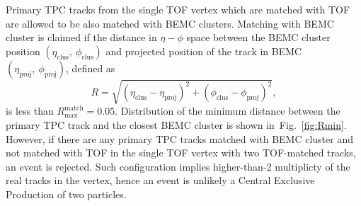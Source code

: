 Primary TPC tracks from the single TOF vertex which are matched with TOF are allowed to be also matched with BEMC clusters. Matching with BEMC cluster is claimed if the distance in $\eta-\phi$ space between the BEMC cluster position $(\eta_{\textrm{clus}},~\phi_{\textrm{clus}})$ and projected position of the track in BEMC $(\eta_{\textrm{proj}},~\phi_{\textrm{proj}})$, defined as
\begin{equation}
 R=\sqrt{(\eta_{\textrm{clus}}-\eta_{\textrm{proj}})^{2} + (\phi_{\textrm{clus}}-\phi_{\textrm{proj}})^{2}},
\end{equation}
is less than $R^{\textrm{match}}_{\textrm{max}} = 0.05$. Distribution of the minimum distance between the primary TPC track and the closest BEMC cluster is shown in~Fig.~\ref{fig:Rmin}. However, if there are any primary TPC tracks matched with BEMC cluster and not matched with TOF in the single TOF vertex with two TOF-matched tracks, an event is rejected. Such configuration implies higher-than-2 multiplicty of the real tracks in the vertex, hence an event is unlikely a Central Exclusive Production of two particles.



